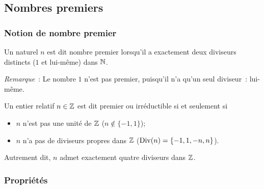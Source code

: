 \subsection{Nombres premiers}

\subsubsection{Notion de nombre premier}

\begin{defdef}
  Un naturel \(n\) est dit nombre premier lorsqu'il a exactement deux diviseurs distincts (\(1\) et lui-même) dans \(\mathbb{N}\).
\end{defdef}

\emph{Remarque}~: Le nombre \(1\) n'est pas premier, puisqu'il n'a qu'un seul diviseur~: lui-même.

\begin{defdef}
  Un entier relatif \(n \in \mathbb{Z}\) est dit premier ou irréductible si et seulement si
  \begin{itemize}
  \item \(n\) n'est pas une unité de \(\mathbb{Z}\) (\(n \notin \{-1,1\}\));
  \item \(n\) n'a pas de diviseurs propres dans \(\mathbb{Z}\) (\(\operatorname{Div}(n) = \{-1, 1, -n, n\}\)).
  \end{itemize}
  Autrement dit, \(n\) admet exactement quatre diviseurs dans \(\mathbb{Z}\).
\end{defdef}

\subsubsection{Propriétés}


